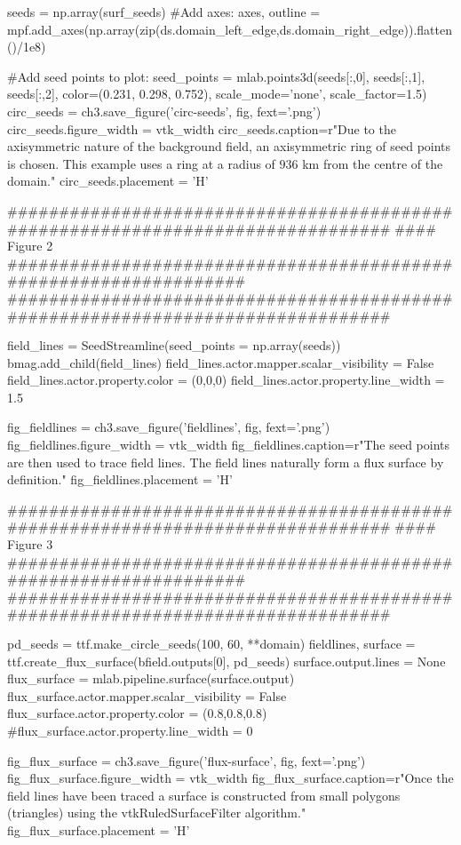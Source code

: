 \begin{pycode}[chapter3a]
seeds = np.array(surf_seeds)
#Add axes:
axes, outline = mpf.add_axes(np.array(zip(ds.domain_left_edge,ds.domain_right_edge)).flatten()/1e8)

#Add seed points to plot:
seed_points = mlab.points3d(seeds[:,0], seeds[:,1], seeds[:,2],
color=(0.231, 0.298, 0.752), scale_mode='none',
scale_factor=1.5)
circ_seeds = ch3.save_figure('circ-seeds', fig, fext='.png')
circ_seeds.figure_width = vtk_width
circ_seeds.caption=r"Due to the axisymmetric nature of the background field, an axisymmetric ring of seed points is chosen. This example uses a ring at a radius of $936$ km from the centre of the domain."
circ_seeds.placement = 'H'

################################################################################
#### Figure 2 ##################################################################
################################################################################

field_lines = SeedStreamline(seed_points = np.array(seeds))
bmag.add_child(field_lines)
field_lines.actor.mapper.scalar_visibility = False
field_lines.actor.property.color = (0,0,0)
field_lines.actor.property.line_width = 1.5

fig_fieldlines = ch3.save_figure('fieldlines', fig, fext='.png')
fig_fieldlines.figure_width = vtk_width
fig_fieldlines.caption=r"The seed points are then used to trace field lines. The field lines naturally form a flux surface by definition."
fig_fieldlines.placement = 'H'

################################################################################
#### Figure 3 ##################################################################
################################################################################

pd_seeds = ttf.make_circle_seeds(100, 60, **domain)
fieldlines, surface = ttf.create_flux_surface(bfield.outputs[0], pd_seeds)
surface.output.lines = None
flux_surface = mlab.pipeline.surface(surface.output)
flux_surface.actor.mapper.scalar_visibility = False
flux_surface.actor.property.color = (0.8,0.8,0.8)
#flux_surface.actor.property.line_width = 0

fig_flux_surface = ch3.save_figure('flux-surface', fig, fext='.png')
fig_flux_surface.figure_width = vtk_width
fig_flux_surface.caption=r"Once the field lines have been traced a surface is constructed from small polygons (triangles) using the vtkRuledSurfaceFilter algorithm."
fig_flux_surface.placement = 'H'


\end{pycode}
